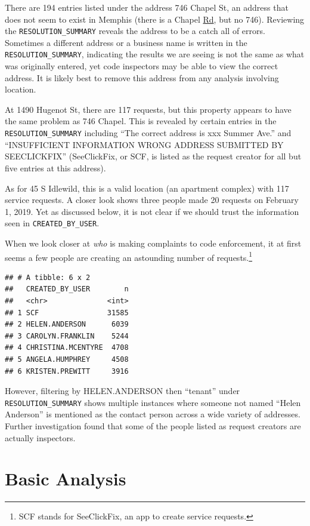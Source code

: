 \documentclass[
  openany]{book}
\begin{document}
There are 194 entries listed under the address 746 Chapel St, an address that does not seem to exist in Memphis (there is a Chapel \underline{Rd}, but no 746). Reviewing the \texttt{RESOLUTION\_SUMMARY} reveals the address to be a catch all of errors. Sometimes a different address or a business name is written in the \texttt{RESOLUTION\_SUMMARY}, indicating the results we are seeing is not the same as what was originally entered, yet code inspectors may be able to view the correct address. It is likely best to remove this address from any analysis involving location.

At 1490 Hugenot St, there are 117 requests, but this property appears to have the same problem as 746 Chapel. This is revealed by certain entries in the \texttt{RESOLUTION\_SUMMARY} including ``The correct address is xxx Summer Ave.'' and ``INSUFFICIENT INFORMATION WRONG ADDRESS SUBMITTED BY SEECLICKFIX'' (SeeClickFix, or SCF, is listed as the request creator for all but five entries at this address).

As for 45 S Idlewild, this is a valid location (an apartment complex) with 117 service requests. A closer look shows three people made 20 requests on February 1, 2019. Yet as discussed below, it is not clear if we should trust the information seen in \texttt{CREATED\_BY\_USER}.

When we look closer at \emph{who} is making complaints to code enforcement, it at first seems a few people are creating an astounding number of requests.\footnote{SCF stands for SeeClickFix, an app to create service requests.}

\begin{verbatim}
## # A tibble: 6 x 2
##   CREATED_BY_USER        n
##   <chr>              <int>
## 1 SCF                31585
## 2 HELEN.ANDERSON      6039
## 3 CAROLYN.FRANKLIN    5244
## 4 CHRISTINA.MCENTYRE  4708
## 5 ANGELA.HUMPHREY     4508
## 6 KRISTEN.PREWITT     3916
\end{verbatim}

However, filtering by HELEN.ANDERSON then ``tenant'' under \texttt{RESOLUTION\_SUMMARY} shows multiple instances where someone not named ``Helen Anderson'' is mentioned as the contact person across a wide variety of addresses. Further investigation found that some of the people listed as request creators are actually inspectors.

\hypertarget{basic-analysis}{%
\section{Basic Analysis}\label{basic-analysis}}
\end{document}
